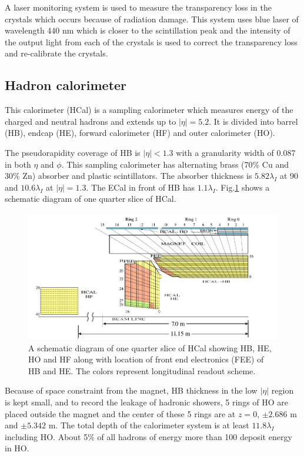 A laser monitoring system is used to measure the transparency loss in the crystals which occurs because of radiation damage. This system 
uses blue laser of wavelength 440 nm which is closer to the scintillation peak and the intensity of the output light from each of the 
crystals is used to correct the transparency loss and re-calibrate the crystals.

\subsection{Hadron calorimeter}
This calorimeter (HCal) is a sampling calorimeter which measures energy of the charged and neutral hadrons and extends up to $|\eta| = 
5.2$. It is divided into barrel (HB), endcap (HE), forward calorimeter (HF) and outer calorimeter (HO). 

The pseudorapidity coverage of HB is $|\eta| < 1.3$ with a granularity width of 0.087 in both $\eta$ and $\phi$. This sampling calorimeter 
has alternating brass (70\% Cu and 30\% Zn) absorber and plastic scintillators. The absorber thickness is $5.82\lambda_I$ at 90\textdegree 
and $10.6\lambda_I$ at $|\eta| =1.3$. The ECal in front of HB has $1.1\lambda_I$. Fig.\ref{fig:Hcal_schematic} shows a schematic diagram 
of one quarter slice of HCal.
\begin{figure}[h!]
\centering
\includegraphics[width=0.9\linewidth]{../Figures/Chap2/Hcal_schematic}
\caption[Schematic diagram of HCal]{A schematic diagram of one quarter slice of HCal showing HB, HE, HO and HF along with location of 
front end electronics (FEE) of HB and HE. The colors represent longitudinal readout scheme.}
\label{fig:Hcal_schematic}
\end{figure}
Because of space constraint from the magnet, HB thickness in the low $|\eta|$ region is kept small, and to record the leakage of hadronic 
showers, 5 rings of HO are placed outside the magnet and the center of these 5 rings are at $z=0$, $\pm2.686$ m and $\pm5.342$ m. The total depth of the calorimeter system is at least $11.8\lambda_I$ including HO.
About 5\% of all hadrons of energy more than 100 \gev deposit energy in HO.

